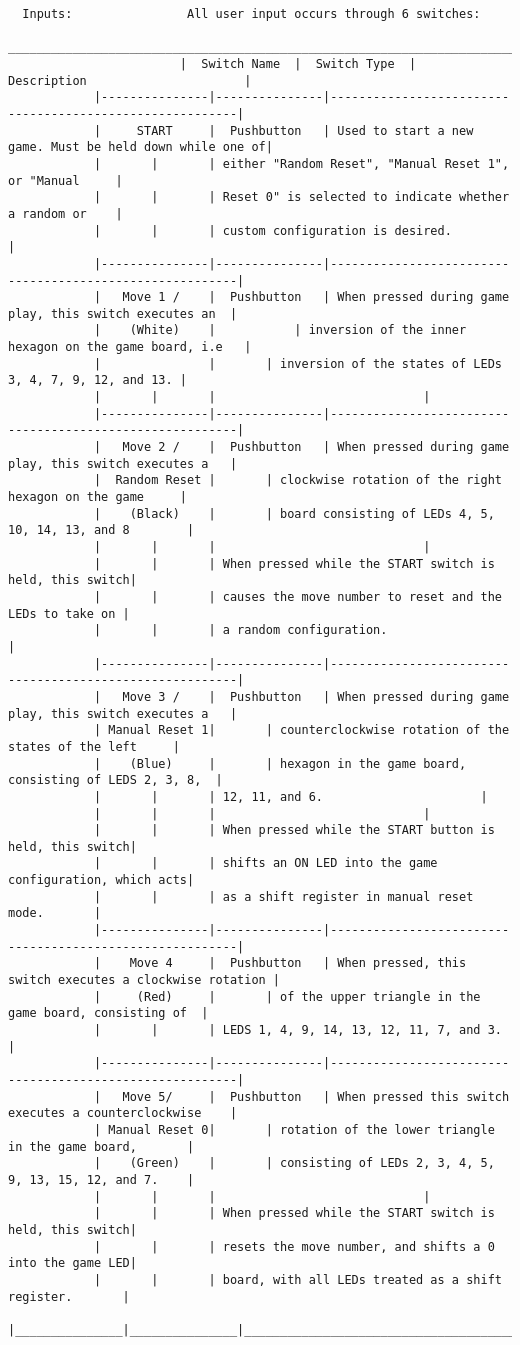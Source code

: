 \documentclass[12 pt]{article}
\begin{document}
\begin{verbatim}
  Inputs:                All user input occurs through 6 switches:
			 _________________________________________________________________________________________
                        |  Switch Name  |  Switch Type  |                        Description                      |
			|---------------|---------------|---------------------------------------------------------|
			|     START     |  Pushbutton   | Used to start a new game. Must be held down while one of|
			|		|		| either "Random Reset", "Manual Reset 1", or "Manual     |
			|		|		| Reset 0" is selected to indicate whether a random or    |
			|		|		| custom configuration is desired.			  |
			|---------------|---------------|---------------------------------------------------------|
			|   Move 1 /    |  Pushbutton   | When pressed during game play, this switch executes an  |
			|    (White)	|        	| inversion of the inner hexagon on the game board, i.e   |
			|               |		| inversion of the states of LEDs 3, 4, 7, 9, 12, and 13. |
			|		|		|							  |
			|---------------|---------------|---------------------------------------------------------|
			|   Move 2 /    |  Pushbutton   | When pressed during game play, this switch executes a   |
			|  Random Reset |		| clockwise rotation of the right hexagon on the game     |
			|    (Black)    |		| board consisting of LEDs 4, 5, 10, 14, 13, and 8        |
			|		|		|							  |
			|		|		| When pressed while the START switch is held, this switch|
			|		|		| causes the move number to reset and the LEDs to take on |
			|		|		| a random configuration.				  |
			|---------------|---------------|---------------------------------------------------------|
			|   Move 3 /    |  Pushbutton   | When pressed during game play, this switch executes a   |  
			| Manual Reset 1|		| counterclockwise rotation of the states of the left     |
			|    (Blue)     |		| hexagon in the game board, consisting of LEDS 2, 3, 8,  |
			|		|		| 12, 11, and 6.					  |
			|		|		|							  |
			|		|		| When pressed while the START button is held, this switch|
			|		|		| shifts an ON LED into the game configuration, which acts|
			|		|		| as a shift register in manual reset mode.		  |
			|---------------|---------------|---------------------------------------------------------|
			|    Move 4     |  Pushbutton   | When pressed, this switch executes a clockwise rotation |
			|     (Red)     |		| of the upper triangle in the game board, consisting of  |
			|		|		| LEDS 1, 4, 9, 14, 13, 12, 11, 7, and 3.                 |
			|---------------|---------------|---------------------------------------------------------|
			|   Move 5/     |  Pushbutton   | When pressed this switch executes a counterclockwise    |
			| Manual Reset 0|		| rotation of the lower triangle in the game board,       |
			|    (Green)	|		| consisting of LEDs 2, 3, 4, 5, 9, 13, 15, 12, and 7.    |
			|		|		|							  |
			|		|		| When pressed while the START switch is held, this switch|
			|		|		| resets the move number, and shifts a 0 into the game LED|
			|		|		| board, with all LEDs treated as a shift register.       |
			|_______________|_______________|_________________________________________________________|



\end{verbatim}
\end{document}
